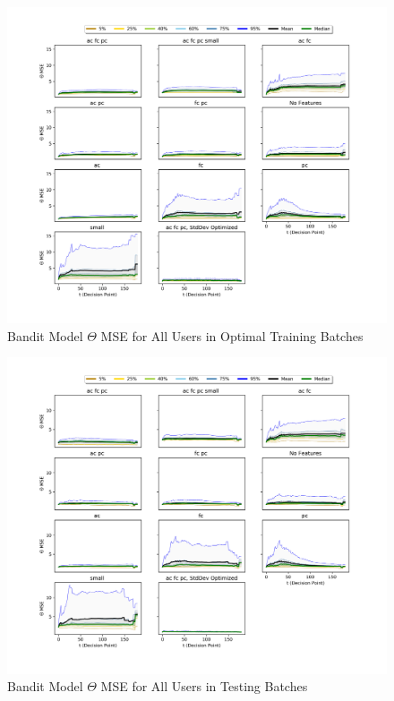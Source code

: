 	\begin{figure}[H]
	\includegraphics[width=1.5\textwidth,center]{figures/QM11train.png}%
	\caption{Bandit Model $\Theta$ MSE for All Users in Optimal Training Batches}
	\label{QM11train}
	\end{figure}

	\begin{figure}[H]
	\includegraphics[width=1.5\textwidth,center]{figures/QM11test.png}%
	\caption{Bandit Model $\Theta$ MSE for All Users in Testing Batches}
	\label{QM11test}
	\end{figure}

